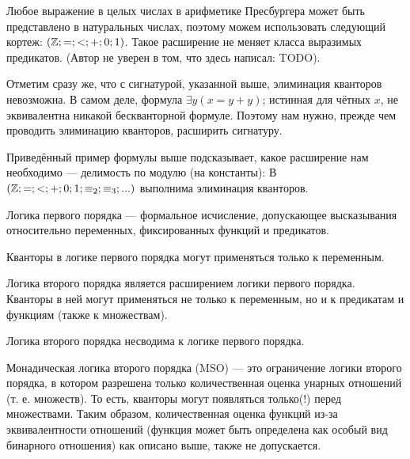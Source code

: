     \begin{Rem}
        Любое выражение в целых числах в арифметике Пресбургера может быть представлено в натуральных числах, поэтому можем использовать следующий кортеж: $(\mathbb{Z}; =; <; +; 0; 1)$. Такое расширение не меняет класса выразимых предикатов. (Автор не уверен в том, что здесь написал: TODO).
    \end{Rem}
    \begin{Rem}
        Отметим сразу же, что с сигнатурой, указанной выше, элиминация кванторов невозможна. В самом деле, формула $\exists y (x = y + y)$; истинная для чётных $x$, не эквивалентна никакой бескванторной формуле. Поэтому нам нужно, прежде чем проводить элиминацию кванторов, расширить сигнатуру.
    \end{Rem}
    \begin{Thm}
        Приведённый пример формулы выше подсказывает, какое расширение нам необходимо --- делимость по модулю (на константы): В $(\mathbb{Z}; =; <; +; 0; 1; \equiv_2; \equiv_3; ...)$ выполнима элиминация кванторов.
    \end{Thm}



    \begin{Def}
        Логика первого порядка --- формальное исчисление, допускающее высказывания относительно переменных, фиксированных функций и предикатов.
    \end{Def}
    \begin{Rem}
        Кванторы в логике первого порядка могут применяться только к переменным.
    \end{Rem}
    \begin{Def}
        Логика второго порядка является расширением логики первого порядка. Кванторы в ней могут применяться не только к переменным, но и к предикатам и функциям (также к множествам).
    \end{Def}
    \begin{Rem}
        Логика второго порядка несводима к логике первого порядка.
    \end{Rem}
    \begin{Def}
        Монадическая логика второго порядка (MSO) — это ограничение логики второго порядка, в котором разрешена только количественная оценка унарных отношений (т. е. множеств). То есть, кванторы могут появляться только(!) перед множествами. Таким образом, количественная оценка функций из-за эквивалентности отношений (функция может быть определена как особый вид бинарного отношения) как описано выше, также не допускается.
    \end{Def}

